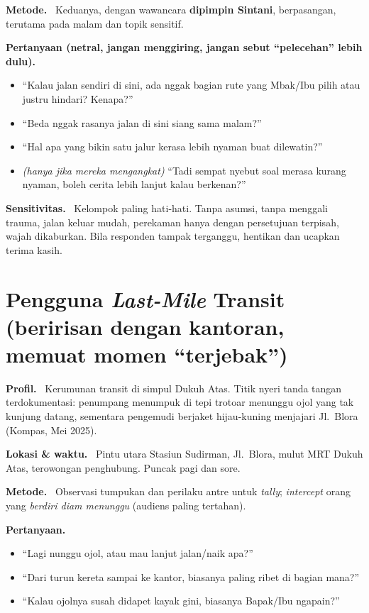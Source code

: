 \documentclass[11pt,a4paper]{report}
\newcommand{\fld}[1]{\smallskip\noindent\textbf{#1.}\ }
\begin{document}
\fld{Metode} Keduanya, dengan wawancara \textbf{dipimpin Sintani}, berpasangan, terutama
pada malam dan topik sensitif.

\fld{Pertanyaan (netral, jangan menggiring, jangan sebut ``pelecehan'' lebih dulu)}
\begin{itemize}
  \item ``Kalau jalan sendiri di sini, ada nggak bagian rute yang Mbak/Ibu pilih atau justru hindari? Kenapa?''
  \item ``Beda nggak rasanya jalan di sini siang sama malam?''
  \item ``Hal apa yang bikin satu jalur kerasa lebih nyaman buat dilewatin?''
  \item \emph{(hanya jika mereka mengangkat)} ``Tadi sempat nyebut soal merasa kurang nyaman, boleh cerita lebih lanjut kalau berkenan?''
\end{itemize}

\fld{Sensitivitas} Kelompok paling hati-hati. Tanpa asumsi, tanpa menggali trauma, jalan
keluar mudah, perekaman hanya dengan persetujuan terpisah, wajah dikaburkan. Bila
responden tampak terganggu, hentikan dan ucapkan terima kasih.

\section{Pengguna \emph{Last-Mile} Transit \textnormal{(beririsan dengan kantoran, memuat momen ``terjebak'')}}
\fld{Profil} Kerumunan transit di simpul Dukuh Atas. Titik nyeri tanda tangan
terdokumentasi: penumpang menumpuk di tepi trotoar menunggu ojol yang tak kunjung datang,
sementara pengemudi berjaket hijau-kuning menjajari Jl.\ Blora (Kompas, Mei 2025).

\fld{Lokasi \& waktu} Pintu utara Stasiun Sudirman, Jl.\ Blora, mulut MRT Dukuh Atas,
terowongan penghubung. Puncak pagi dan sore.

\fld{Metode} Observasi tumpukan dan perilaku antre untuk \emph{tally}; \emph{intercept}
orang yang \emph{berdiri diam menunggu} (audiens paling tertahan).

\fld{Pertanyaan}
\begin{itemize}
  \item ``Lagi nunggu ojol, atau mau lanjut jalan/naik apa?''
  \item ``Dari turun kereta sampai ke kantor, biasanya paling ribet di bagian mana?''
  \item ``Kalau ojolnya susah didapet kayak gini, biasanya Bapak/Ibu ngapain?''
\end{itemize}
\end{document}
